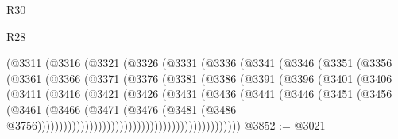 \begin{lexlean}{R30}
\begin{lexlean}{R28}
\begin{coremodule}
{{{{{{{{{{{{{{{{{{{{{{{{{{{{{{{{{{{{{{{{{{{{{{{{{{{{{{{{{{{{{{{{{{{{{{{{{{{{{{{{{{{{{{{{{{{{{{{{{{{{{{{{{{{{{{{{{{{{{{{{{{{{{{{{{{{{{{{{{{{{{{{                          (@3311
                            (@3316
                              (@3321
                                (@3326
                                  (@3331
                                    (@3336
                                      (@3341
                                        (@3346
                                          (@3351
                                            (@3356
                                              (@3361
                                                (@3366
                                                  (@3371
                                                    (@3376
                                                      (@3381
                                                        (@3386
                                                          (@3391
                                                            (@3396
                                                              (@3401
                                                                (@3406
                                                                  (@3411
                                                                    (@3416
                                                                      (@3421
                                                                        (@3426
                                                                          (@3431
                                                                            (@3436
                                                                              (@3441
                                                                                (@3446
                                                                                  (@3451
                                                                                    (@3456
                                                                                      (@3461
                                                                                        (@3466
                                                                                          (@3471
                                                                                            (@3476
                                                                                              (@3481
                                                                                                (@3486
                                                                                                  @3756)))))))))))))))))))))))))))))))))))))))))))))))
@3852 := @3021
}}}}}}}}}}}}}}}}}}}}}}}}}}}}}}}}}}}}}}}}}}}}}}}}}}}}}}}}}}}}}}}}}}}}}}}}}}}}}}}}}}}}}}}}}}}}}}}}}}}}}}}}}}}}}}}}}}}}}}}}}}}}}}}}}}}}}}}}}}}}}}}
\end{coremodule}
\end{lexlean}
\end{lexlean}
